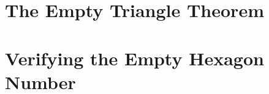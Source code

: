 \documentclass{easychair}
\begin{document}
\section{The Empty Triangle Theorem}
\label{sec:empty-triangle}


\section{Verifying the Empty Hexagon Number}
\label{sec:empty-hexagon-number}



%
%
%



\end{document}
